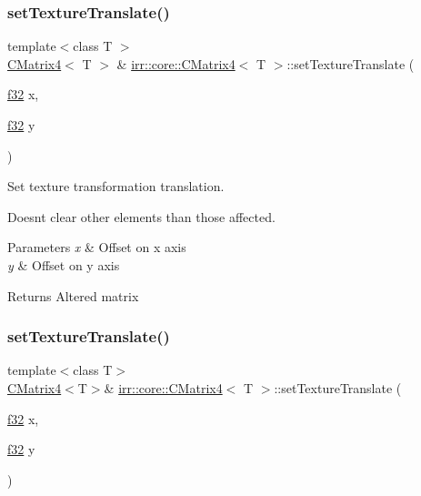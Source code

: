 \subsubsection{\texorpdfstring{set\+Texture\+Translate()}{setTextureTranslate()}\hspace{0.1cm}{\footnotesize\ttfamily [1/2]}}
{\footnotesize\ttfamily template$<$class T $>$ \\
\hyperlink{classirr_1_1core_1_1CMatrix4}{C\+Matrix4}$<$ T $>$ \& \hyperlink{classirr_1_1core_1_1CMatrix4}{irr\+::core\+::\+C\+Matrix4}$<$ T $>$\+::set\+Texture\+Translate (\begin{DoxyParamCaption}\item[{\hyperlink{namespaceirr_a0277be98d67dc26ff93b1a6a1d086b07}{f32}}]{x,  }\item[{\hyperlink{namespaceirr_a0277be98d67dc26ff93b1a6a1d086b07}{f32}}]{y }\end{DoxyParamCaption})\hspace{0.3cm}{\ttfamily [inline]}}



Set texture transformation translation. 

Doesn\textquotesingle{}t clear other elements than those affected. 
\begin{DoxyParams}{Parameters}
{\em x} & Offset on x axis \\
\hline
{\em y} & Offset on y axis \\
\hline
\end{DoxyParams}
\begin{DoxyReturn}{Returns}
Altered matrix 
\end{DoxyReturn}
\mbox{\label{classirr_1_1core_1_1CMatrix4_a8ebaecaf081c12b2a9e0cf22c86eb498}} 
\subsubsection{\texorpdfstring{set\+Texture\+Translate()}{setTextureTranslate()}\hspace{0.1cm}{\footnotesize\ttfamily [2/2]}}
{\footnotesize\ttfamily template$<$class T$>$ \\
\hyperlink{classirr_1_1core_1_1CMatrix4}{C\+Matrix4}$<$T$>$\& \hyperlink{classirr_1_1core_1_1CMatrix4}{irr\+::core\+::\+C\+Matrix4}$<$ T $>$\+::set\+Texture\+Translate (\begin{DoxyParamCaption}\item[{\hyperlink{namespaceirr_a0277be98d67dc26ff93b1a6a1d086b07}{f32}}]{x,  }\item[{\hyperlink{namespaceirr_a0277be98d67dc26ff93b1a6a1d086b07}{f32}}]{y }\end{DoxyParamCaption})}




